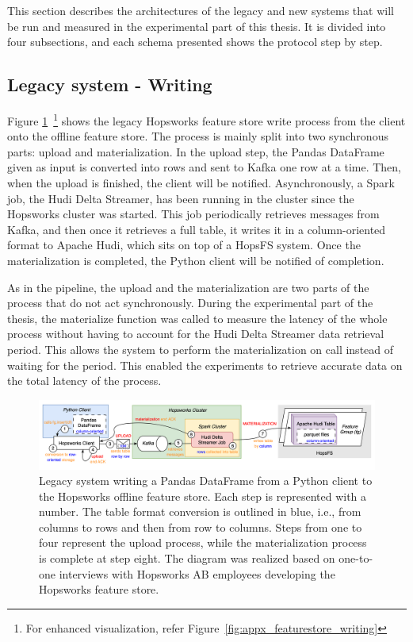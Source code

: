 This section describes the architectures of the legacy and new systems that will be run and measured in the experimental part of this thesis. It is divided into four subsections, and each schema presented shows the protocol step by step.

\subsection{Legacy system - Writing}
\label{subsec:legacy_sys_writing}

Figure \ref{fig:featurestore_writing}~\footnote{For enhanced visualization, refer Figure~\ref{fig:appx_featurestore_writing}} shows the legacy Hopsworks feature store write process from the client onto the offline feature store. The process is mainly split into two synchronous parts: upload and materialization. In the upload step, the Pandas DataFrame given as input is converted into rows and sent to Kafka one row at a time. Then, when the upload is finished, the client will be notified. Asynchronously, a Spark job, the Hudi Delta Streamer, has been running in the cluster since the Hopsworks cluster was started. This job periodically retrieves messages from Kafka, and then once it retrieves a full table, it writes it in a column-oriented format to Apache Hudi, which sits on top of a \gls{HopsFS} system. Once the materialization is completed, the Python client will be notified of completion.

As in the pipeline, the upload and the materialization are two parts of the process that do not act synchronously. During the experimental part of the thesis, the materialize function was called to measure the latency of the whole process without having to account for the Hudi Delta Streamer data retrieval period. This allows the system to perform the materialization on call instead of waiting for the period. This enabled the experiments to retrieve accurate data on the total latency of the process.

\begin{figure}
    \begin{center}
      \includegraphics[width=\textwidth]{figures/2-background/FeatureStore-writing.png}
    \end{center}
    \caption[Legacy system - Write process]{Legacy system writing a Pandas DataFrame from a Python client to the Hopsworks offline feature store. Each step is represented with a number. The table format conversion is outlined in blue, i.e., from columns to rows and then from row to columns. Steps from one to four represent the upload process, while the materialization process is complete at step eight. The diagram was realized based on one-to-one interviews with Hopsworks AB employees developing the Hopsworks feature store.}
    \label{fig:featurestore_writing}
\end{figure}

